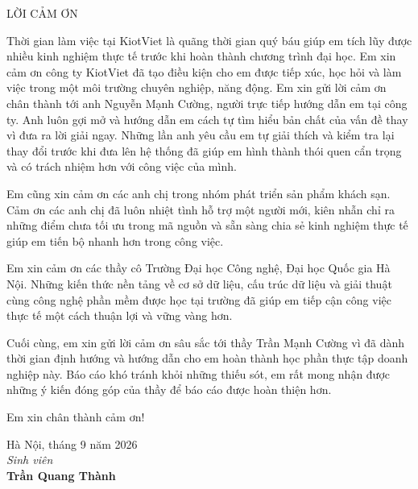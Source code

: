 \thispagestyle{empty}
\begin{center}
{\fontsize{17}{22}\selectfont LỜI CẢM ƠN}
\end{center}
\vspace{20pt}

Thời gian làm việc tại KiotViet là quãng thời gian quý báu giúp em tích lũy được nhiều kinh nghiệm thực tế trước khi hoàn thành chương trình đại học. Em xin cảm ơn công ty KiotViet đã tạo điều kiện cho em được tiếp xúc, học hỏi và làm việc trong một môi trường chuyên nghiệp, năng động. Em xin gửi lời cảm ơn chân thành tới anh Nguyễn Mạnh Cường, người trực tiếp hướng dẫn em tại công ty. Anh luôn gợi mở và hướng dẫn em cách tự tìm hiểu bản chất của vấn đề thay vì đưa ra lời giải ngay. Những lần anh yêu cầu em tự giải thích và kiểm tra lại thay đổi trước khi đưa lên hệ thống đã giúp em hình thành thói quen cẩn trọng và có trách nhiệm hơn với công việc của mình.

Em cũng xin cảm ơn các anh chị trong nhóm phát triển sản phẩm khách sạn. Cảm ơn các anh chị đã luôn nhiệt tình hỗ trợ một người mới, kiên nhẫn chỉ ra những điểm chưa tối ưu trong mã nguồn và sẵn sàng chia sẻ kinh nghiệm thực tế giúp em tiến bộ nhanh hơn trong công việc.

Em xin cảm ơn các thầy cô Trường Đại học Công nghệ, Đại học Quốc gia Hà Nội. Những kiến thức nền tảng về cơ sở dữ liệu, cấu trúc dữ liệu và giải thuật cùng công nghệ phần mềm được học tại trường đã giúp em tiếp cận công việc thực tế một cách thuận lợi và vững vàng hơn.

Cuối cùng, em xin gửi lời cảm ơn sâu sắc tới thầy Trần Mạnh Cường vì đã dành thời gian định hướng và hướng dẫn cho em hoàn thành học phần thực tập doanh nghiệp này. Báo cáo khó tránh khỏi những thiếu sót, em rất mong nhận được những ý kiến đóng góp của thầy để báo cáo được hoàn thiện hơn.

Em xin chân thành cảm ơn!

\vspace{24pt}
\begin{flushright}
\begin{minipage}{0.5\textwidth}
\centering
Hà Nội, tháng 9 năm 2026\\
\textit{Sinh viên}\\[26pt]
\textbf{Trần Quang Thành}
\end{minipage}
\end{flushright}

\clearpage
